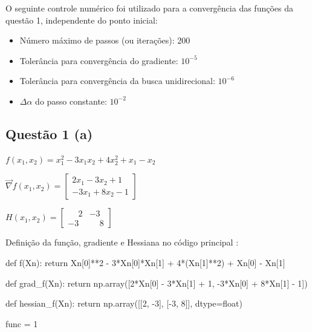 \documentclass[10pt, a4paper]{article}
\begin{document}
O seguinte controle numérico foi utilizado para a convergência das funções da questão 1, independente do ponto inicial:

\begin{itemize}
  \item Número máximo de passos (ou iterações): 200
  \item Tolerância para convergência do gradiente: $10^{-5}$
  \item Tolerância para convergência da busca unidirecional: $10^{-6}$
  \item $\Delta\alpha$ do passo constante: $10^{-2}$
\end{itemize}

\subsection{Questão 1 (a)}

\vspace{5mm}

\begin{center}
$f(x_1,x_2) = x_1^2 - 3x_1x_2 + 4x_2^2 + x_1 - x_2$

\vspace{5mm}
$\overrightarrow{\nabla} f(x_1,x_2) = 
\begin{bmatrix}
  2x_1 - 3x_2 + 1 \\ -3x_1 + 8x_2 -1
\end{bmatrix}$

\vspace{5mm}

$H(x_1,x_2) = 
\begin{bmatrix}
  \phantom{-}2 & -3 \\ -3 & \phantom{-}8
\end{bmatrix}$

\end{center}

\vspace{5mm}

Definição da função, gradiente e Hessiana no código principal :

\begin{python}
  def f(Xn):
    return Xn[0]**2 - 3*Xn[0]*Xn[1] + 4*(Xn[1]**2) + Xn[0] - Xn[1]
    
  def grad_f(Xn):
      return np.array([2*Xn[0] - 3*Xn[1] + 1, -3*Xn[0] + 8*Xn[1] - 1])
      
  def hessian_f(Xn):
      return np.array([[2, -3],
                      [-3, 8]], dtype=float)
    
  func = 1
\end{python}
\end{document}
